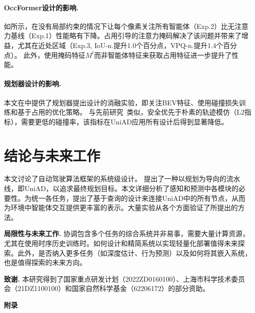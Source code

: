 \documentclass[10pt,twocolumn,letterpaper]{article}
\begin{document}
\vspace{-5pt}
\paragraph{OccFormer设计的影响.}
如所示，在没有局部约束的情况下让每个像素关注所有智能体（Exp.2）比无注意力基线（Exp.1）性能略有下降。占用引导的注意力掩码解决了该问题并带来了增益，尤其在近处区域（Exp.3, IoU-n.提升1.0个百分点，VPQ-n.提升1.4个百分点）。
%
此外，使用掩码特征$M^t$而非智能体特征来获取占用特征进一步提升了性能。


\vspace{-5pt}
\paragraph{规划器设计的影响.}
本文在中提供了规划器提出设计的消融实验，即关注BEV特征、使用碰撞损失训练和基于占用的优化策略。
%
与先前研究~\cite{hu2021safe,hu2022stp3}类似，安全优先于朴素的轨迹模仿（L2指标），需要更低的碰撞率，该指标在UniAD应用所有设计后得到显著降低。


\section{结论与未来工作}
\label{sec:conclusion}
\vspace{-4pt}

本文讨论了自动驾驶算法框架的系统级设计。
提出了一种以规划为导向的流水线，即UniAD，以追求最终规划目标。本文详细分析了感知和预测中各模块的必要性。为统一各任务，提出了基于查询的设计来连接UniAD中的所有节点，从而为环境中智能体交互提供更丰富的表示。大量实验从各个方面验证了所提出的方法。

\smallskip
\noindent\textbf{局限性与未来工作.} 协调包含多个任务的综合系统并非易事，需要大量计算资源，尤其在使用时序历史训练时。如何设计和精简系统以实现轻量化部署值得未来探索。此外，是否纳入更多任务（如深度估计、行为预测）以及如何将其嵌入系统，也是值得探索的未来方向。

\smallskip
\noindent\textbf{致谢.} 本研究得到了国家重点研发计划（2022ZD0160100）、上海市科学技术委员会（21DZ1100100）和国家自然科学基金（62206172）的部分资助。

{\small


}

\appendix
\clearpage
\newpage

\noindent\textbf{\large{附录}}

\startcontents
{
    \hypersetup{linkcolor=black}
}
\newpage
\end{document}
